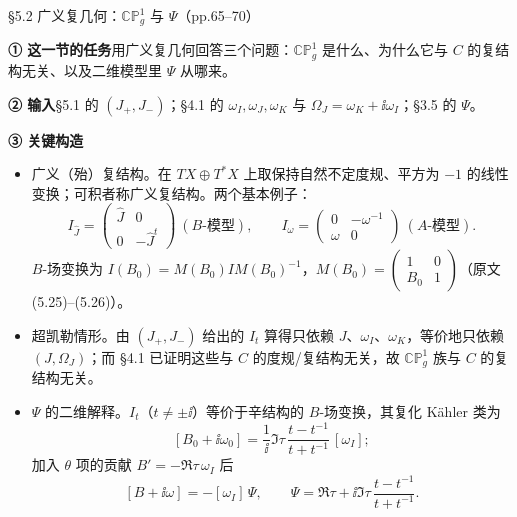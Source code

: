 \begin{kcard}{§5.2 广义复几何：$\mathbb{CP}^1_g$ 与 $\Psi$（pp.65--70）}

\noindent\textbf{① 这一节的任务}\quad 用广义复几何回答三个问题：$\mathbb{CP}^1_g$ 是什么、为什么它与 $C$ 的复结构无关、以及二维模型里 $\Psi$ 从哪来。\pA{}

\noindent\textbf{② 输入}\quad \S5.1 的 $(J_+,J_-)$；\S4.1 的 $\omega_I,\omega_J,\omega_K$ 与 $\Omega_J=\omega_K+\ii\omega_I$；\S3.5 的 $\Psi$。

\noindent\textbf{③ 关键构造}\quad
\begin{itemize}
\item 广义（殆）复结构。在 $TX\oplus T^*X$ 上取保持自然不定度规、平方为 $-1$ 的线性变换；可积者称广义复结构。两个基本例子：
\begin{equation}\tag{5.23--5.24}\label{l1:gb}
I_{\hat J}=\begin{pmatrix}\hat J&0\\0&-\hat J^t\end{pmatrix}\ (B\text{-模型}),\qquad
I_\omega=\begin{pmatrix}0&-\omega^{-1}\\ \omega&0\end{pmatrix}\ (A\text{-模型}) .
\end{equation}
$B$-场变换为 $I(B_0)=M(B_0)IM(B_0)^{-1}$，$M(B_0)=\begin{pmatrix}1&0\\B_0&1\end{pmatrix}$（原文 (5.25)--(5.26)）。\pA{}
\item 超凯勒情形。由 $(J_+,J_-)$ 给出的 $I_t$ 算得只依赖 $J$、$\omega_I$、$\omega_K$，等价地只依赖 $(J,\Omega_J)$；而 \S4.1 已证明这些与 $C$ 的度规/复结构无关，故 $\mathbb{CP}^1_g$ 族与 $C$ 的复结构无关。\pA{}
\item $\Psi$ 的二维解释。$I_t$（$t\ne\pm\ii$）等价于辛结构的 $B$-场变换，其复化 Kähler 类为
\begin{equation}\label{l1:bk}\tag{5.33}
[B_0+\ii\omega_0]=\frac{1}{\ii}\Im\tau\,\frac{t-t^{-1}}{t+t^{-1}}\,[\omega_I] ;
\end{equation}
加入 $\theta$ 项的贡献 $B'=-\Re\tau\,\omega_I$ 后
\begin{equation}\label{l1:psi2d}\tag{5.34}
[B+\ii\omega]=-[\omega_I]\,\Psi,\qquad
\Psi=\Re\tau+\ii\Im\tau\,\frac{t-t^{-1}}{t+t^{-1}} .
\end{equation}
\pA{}
\end{itemize}


\end{kcard}
